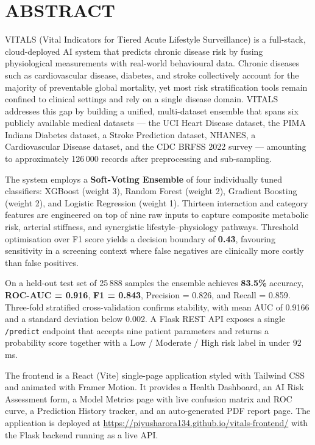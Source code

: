 \documentclass[12pt,a4paper]{report}
\begin{document}
\chapter*{ABSTRACT}
\thispagestyle{fancy}

VITALS (Vital Indicators for Tiered Acute Lifestyle Surveillance) is a full-stack, cloud-deployed AI system that predicts chronic disease risk by fusing physiological measurements with real-world behavioural data. Chronic diseases such as cardiovascular disease, diabetes, and stroke collectively account for the majority of preventable global mortality, yet most risk stratification tools remain confined to clinical settings and rely on a single disease domain. VITALS addresses this gap by building a unified, multi-dataset ensemble that spans six publicly available medical datasets — the UCI Heart Disease dataset, the PIMA Indians Diabetes dataset, a Stroke Prediction dataset, NHANES, a Cardiovascular Disease dataset, and the CDC BRFSS 2022 survey — amounting to approximately 126\,000 records after preprocessing and sub-sampling.

The system employs a \textbf{Soft-Voting Ensemble} of four individually tuned classifiers: XGBoost (weight 3), Random Forest (weight 2), Gradient Boosting (weight 2), and Logistic Regression (weight 1). Thirteen interaction and category features are engineered on top of nine raw inputs to capture composite metabolic risk, arterial stiffness, and synergistic lifestyle--physiology pathways. Threshold optimisation over F1 score yields a decision boundary of \textbf{0.43}, favouring sensitivity in a screening context where false negatives are clinically more costly than false positives.

On a held-out test set of 25\,888 samples the ensemble achieves \textbf{83.5\%} accuracy, \textbf{ROC-AUC = 0.916}, \textbf{F1 = 0.843}, Precision = 0.826, and Recall = 0.859. Three-fold stratified cross-validation confirms stability, with mean AUC of 0.9166 and a standard deviation below 0.002. A Flask REST API exposes a single \texttt{/predict} endpoint that accepts nine patient parameters and returns a probability score together with a Low / Moderate / High risk label in under 92\,ms.

The frontend is a React (Vite) single-page application styled with Tailwind CSS and animated with Framer Motion. It provides a Health Dashboard, an AI Risk Assessment form, a Model Metrics page with live confusion matrix and ROC curve, a Prediction History tracker, and an auto-generated PDF report page. The application is deployed at \url{https://piyusharora134.github.io/vitals-frontend/} with the Flask backend running as a live API.
\end{document}
